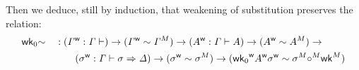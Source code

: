Then we deduce, still by induction, that weakening of substitution preserves the
relation:
\begin{alignat*}{5}
  & \mathsf{wk}_0{\sim} && :
  ({\mathit{\Gamma}}^{\mathsf{w}} : \mathit{\Gamma} \vdash) \rightarrow
  ({\mathit{\Gamma}}^{\mathsf{w}} \sim {\mathit{\Gamma}}^M) \rightarrow
  ({A}^{\mathsf{w}} : \mathit{\Gamma} \vdash A) \rightarrow
  ({A}^{\mathsf{w}} \sim {A}^M) \rightarrow
  \\
  &&& \qquad
  ({\sigma}^{\mathsf{w}} : \mathit{\Gamma}\vdash \sigma \Rightarrow \mathit{\Delta}) \rightarrow
  ({\sigma}^{\mathsf{w}} \sim {\sigma}^M) \rightarrow
  ({\mathsf{wk}_0}^{\mathsf{w}}{A}^{\mathsf{w}}{\sigma}^{\mathsf{w}} \sim {\sigma}^M{\circ}^M{\mathsf{wk}}^M)
  \end{alignat*}




